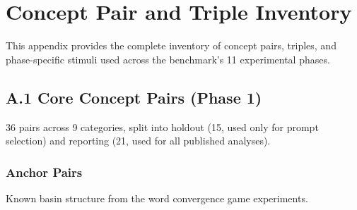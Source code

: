 \section{Concept Pair and Triple Inventory}\label{appendix-a-concept-pair-and-triple-inventory}

This appendix provides the complete inventory of concept pairs, triples, and phase-specific stimuli used across the benchmark's 11 experimental phases.

\subsection{A.1 Core Concept Pairs (Phase 1)}\label{a.1-core-concept-pairs-phase-1}

36 pairs across 9 categories, split into holdout (15, used only for prompt selection) and reporting (21, used for all published analyses).

\subsubsection{Anchor Pairs}\label{anchor-pairs}

Known basin structure from the word convergence game experiments.

